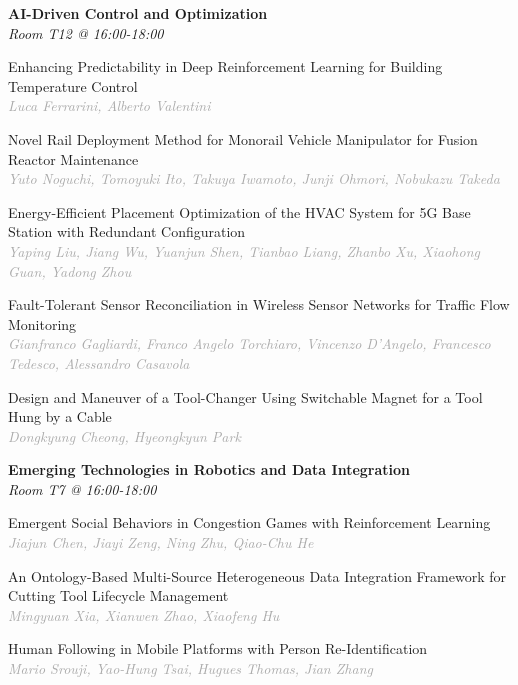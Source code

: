 \begin{multicols*}{2}
\normalsize \textbf{AI-Driven Control and Optimization}\\
\small \textit{Room T12 @ 16:00-18:00}

\small Enhancing Predictability in Deep Reinforcement Learning for Building Temperature Control\\ 
\footnotesize \textcolor{darkgray}{\textit{Luca Ferrarini, Alberto  Valentini}}

\small Novel Rail Deployment Method for Monorail Vehicle Manipulator for Fusion Reactor Maintenance\\ 
\footnotesize \textcolor{darkgray}{\textit{Yuto Noguchi, Tomoyuki  Ito, Takuya  Iwamoto, Junji  Ohmori, Nobukazu  Takeda}}

\small Energy-Efficient Placement Optimization of the HVAC System for 5G Base Station with Redundant Configuration\\ 
\footnotesize \textcolor{darkgray}{\textit{Yaping Liu, Jiang  Wu, Yuanjun  Shen, Tianbao  Liang, Zhanbo  Xu, Xiaohong  Guan, Yadong  Zhou}}

\small Fault-Tolerant Sensor Reconciliation in Wireless Sensor Networks for Traffic Flow Monitoring\\ 
\footnotesize \textcolor{darkgray}{\textit{Gianfranco Gagliardi, Franco Angelo  Torchiaro, Vincenzo  D'Angelo, Francesco  Tedesco, Alessandro  Casavola}}

\small Design and Maneuver of a Tool-Changer Using Switchable Magnet for a Tool Hung by a Cable\\ 
\footnotesize \textcolor{darkgray}{\textit{Dongkyung Cheong, Hyeongkyun  Park}}

\normalsize \textbf{Emerging Technologies in Robotics and Data Integration}\\
\small \textit{Room T7 @ 16:00-18:00}

\small Emergent Social Behaviors in Congestion Games with Reinforcement Learning\\ 
\footnotesize \textcolor{darkgray}{\textit{Jiajun Chen, Jiayi  Zeng, Ning  Zhu, Qiao-Chu  He}}

\small An Ontology-Based Multi-Source Heterogeneous Data Integration Framework for Cutting Tool Lifecycle Management\\ 
\footnotesize \textcolor{darkgray}{\textit{Mingyuan Xia, Xianwen  Zhao, Xiaofeng  Hu}}

\small Human Following in Mobile Platforms with Person Re-Identification\\ 
\footnotesize \textcolor{darkgray}{\textit{Mario Srouji, Yao-Hung  Tsai, Hugues  Thomas, Jian  Zhang}}


\end{multicols*}

